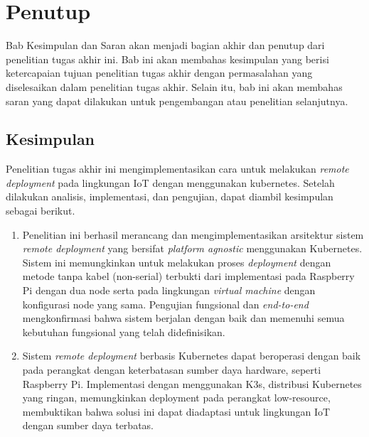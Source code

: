 \chapter{Penutup}

Bab Kesimpulan dan Saran akan menjadi bagian akhir dan penutup dari penelitian tugas akhir ini. Bab ini akan membahas kesimpulan yang berisi ketercapaian tujuan penelitian tugas akhir dengan permasalahan yang diselesaikan dalam penelitian tugas akhir. Selain itu, bab ini akan membahas saran yang dapat dilakukan untuk pengembangan atau penelitian selanjutnya.

\section{Kesimpulan}
Penelitian tugas akhir ini mengimplementasikan cara untuk melakukan \textit{remote deployment} pada lingkungan IoT dengan menggunakan kubernetes. Setelah dilakukan analisis, implementasi, dan pengujian, dapat diambil kesimpulan sebagai berikut.
\begin{enumerate}
  \item  Penelitian ini berhasil merancang dan mengimplementasikan arsitektur sistem \textit{remote deployment} yang bersifat \textit{platform agnostic} menggunakan Kubernetes. Sistem ini memungkinkan untuk melakukan proses \textit{deployment} dengan metode tanpa kabel (non-serial) terbukti dari implementasi pada Raspberry Pi dengan dua node serta pada lingkungan \textit{virtual machine} dengan konfigurasi node yang sama. Pengujian fungsional dan \textit{end-to-end} mengkonfirmasi bahwa sistem berjalan dengan baik dan memenuhi semua kebutuhan fungsional yang telah didefinisikan.
  \item Sistem \textit{remote deployment} berbasis Kubernetes dapat beroperasi dengan baik pada perangkat dengan keterbatasan sumber daya hardware, seperti Raspberry Pi. Implementasi dengan menggunakan K3s, distribusi Kubernetes yang ringan, memungkinkan deployment pada perangkat low-resource, membuktikan bahwa solusi ini dapat diadaptasi untuk lingkungan IoT dengan sumber daya terbatas.
\end{enumerate}

